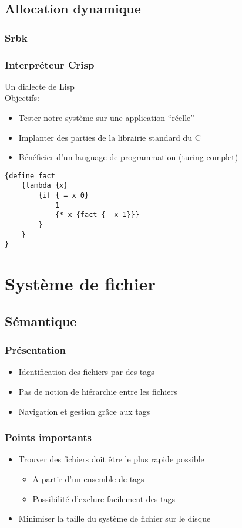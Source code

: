 \documentclass{beamer}
\begin{document}
\subsection{Allocation dynamique}
\begin{frame}
  \frametitle{Srbk}
\end{frame}

\begin{frame}[fragile]
  \frametitle{Interpréteur Crisp}
  Un dialecte de Lisp\\
  Objectifs:
  \begin{itemize}
  \item Tester notre système sur une application ``réelle''
  \item Implanter des parties de la librairie standard du C
  \item Bénéficier d'un language de programmation (turing complet)
  \end{itemize}

  {\scriptsize
\begin{verbatim}
{define fact
    {lambda {x}
        {if { = x 0}
            1
            {* x {fact {- x 1}}}
        }
    }
}
\end{verbatim}
}
\end{frame}

\section{Système de fichier}
\subsection{Sémantique}
\begin{frame}
  \frametitle{Présentation}
  \begin{itemize}
  \item Identification des fichiers par des tags
  \item Pas de notion de hiérarchie entre les fichiers
  \item Navigation et gestion grâce aux tags
  \end{itemize}
\end{frame}

\begin{frame}
  \frametitle{Points importants}
  \begin{itemize}
  \item Trouver des fichiers doit être le plus rapide possible
    \begin{itemize}
      \item A partir d'un ensemble de tags
      \item Possibilité d'exclure facilement des tags
    \end{itemize}
  \item Minimiser la taille du système de fichier sur le disque
  \end{itemize}
\end{frame}
\end{document}
